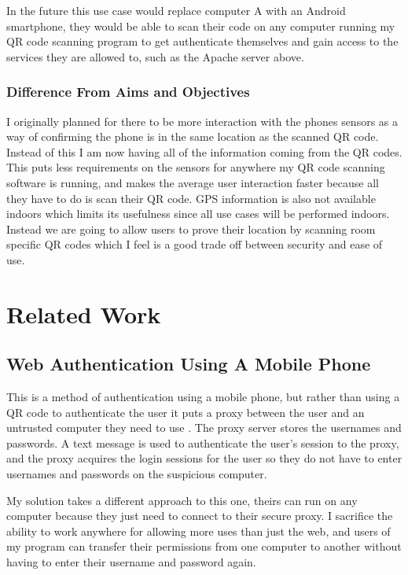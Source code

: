\documentclass[]{report}   %
\begin{document}
In the future this use case would replace computer A with an Android smartphone, they would be able to scan their code on any computer running my QR code scanning program to get authenticate themselves and gain access to the services they are allowed to, such as the Apache server above.


\subsubsection{Difference From Aims and Objectives} 
I originally planned for there to be more interaction with the phones sensors as a way of confirming the phone is in the same location as the scanned QR code. Instead of this I am now having all of the information coming from the QR codes. This puts less requirements on the sensors for anywhere my QR code scanning software is running, and makes the average user interaction faster because all they have to do is scan their QR code. GPS information is also not available indoors which limits its usefulness since all use cases will be performed indoors. Instead we are going to allow users to prove their location by scanning room specific QR codes which I feel is a good trade off between security and ease of use.


\section{Related Work}
\subsection {Web Authentication Using A Mobile Phone}
This is a method of authentication using a mobile phone, but rather than using a QR code to authenticate the user it puts a proxy between the user and an untrusted computer they need to use \cite{MobileRelated}. The proxy server stores the usernames and passwords. A text message is used to authenticate the user's session to the proxy, and the proxy acquires the login sessions for the user so they do not have to enter usernames and passwords on the suspicious computer.

My solution takes a different approach to this one, theirs can run on any computer because they just need to connect to their secure proxy. I sacrifice the ability to work anywhere for allowing more uses than just the web, and users of my program can transfer their permissions from one computer to another without having to enter their username and password again. 
\end{document}
